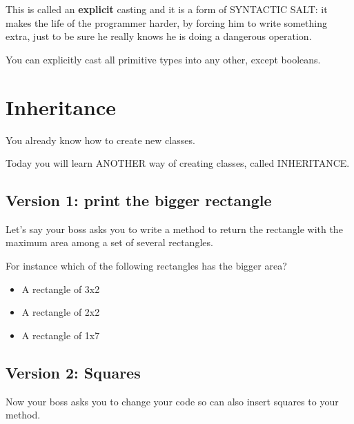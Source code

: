 \documentclass[a4paper, 9pt]{extarticle}
\begin{document}
This is called an \textbf{explicit} casting and it is a form of SYNTACTIC SALT:
it makes the life of the programmer harder, by forcing him to write something
extra, just to be sure he really knows he is doing a dangerous operation.

You can explicitly cast all primitive types into any other, except booleans.












\section{Inheritance}

You already know how to create new classes.

Today you will learn ANOTHER way of creating classes, called INHERITANCE.

\subsection{Version 1: print the bigger rectangle}

Let's say your boss asks you to write a method to return the rectangle with the
maximum area among a set of several rectangles.

For instance which of the following rectangles has the bigger area?

\begin{itemize}
  \item A rectangle of 3x2
  \item A rectangle of 2x2
  \item A rectangle of 1x7
\end{itemize}

\begin{multicols}{2}
\columnbreak
\end{multicols}


\subsection{Version 2: Squares}

Now your boss asks you to change your code so can also insert squares to your
method.
\end{document}
